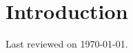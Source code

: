 \documentclass[12pt]{article}
\title{\documenttitlepage}
\date{\documentdate}
\begin{document}

    \maketitle
    \thispagestyle{empty}
    
    \begin{abstract}
        
    \end{abstract}


    \tableofcontents


    \newpage
    \section{Introduction}


    \newpage
    \thispagestyle{empty}

    \vspace*{\fill}

    \begin{center}
        Last reviewed on \today.
    \end{center}

    \vspace*{\fill}
\end{document}
